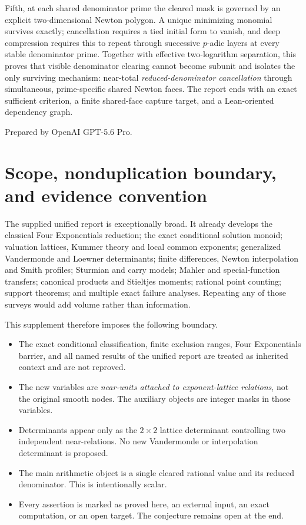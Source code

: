 \documentclass[11pt,oneside]{article}
\theoremstyle{definition}
\theoremstyle{remark}
\begin{document}
\begin{titlepage}
\begin{minipage}{0.91\textwidth}
Fifth, at each shared denominator prime the cleared mask is governed by an explicit
two-dimensional Newton polygon.  A unique minimizing monomial survives exactly; cancellation
requires a tied initial form to vanish, and deep compression requires this to repeat through
successive $p$-adic layers at every stable denominator prime.  Together with effective
two-logarithm separation, this proves that visible denominator clearing cannot become subunit
and isolates the only surviving mechanism: near-total \emph{reduced-denominator cancellation}
through simultaneous, prime-specific shared Newton faces.  The report ends with an exact
sufficient criterion, a finite shared-face capture target, and a Lean-oriented dependency
graph.
\end{minipage}
\vfill
{\small Prepared by OpenAI GPT-5.6 Pro.}
\end{titlepage}

\tableofcontents
\clearpage
{}

\section{Scope, nonduplication boundary, and evidence convention}
\label{sec:scope}

The supplied unified report is exceptionally broad.  It already develops the classical
Four Exponentials reduction; the exact conditional solution monoid; valuation lattices,
Kummer theory and local common exponents; generalized Vandermonde and Loewner determinants;
finite differences, Newton interpolation and Smith profiles; Sturmian and carry models;
Mahler and special-function transfers; canonical products and Stieltjes moments; rational
point counting; support theorems; and multiple exact failure analyses.  Repeating any of
those surveys would add volume rather than information.

This supplement therefore imposes the following boundary.

\begin{itemize}
\item The exact conditional classification, finite exclusion ranges, Four Exponentials
  barrier, and all named results of the unified report are treated as inherited context and
  are not reproved.
\item The new variables are \emph{near-units attached to exponent-lattice relations}, not
  the original smooth nodes.  The auxiliary objects are integer masks in those variables.
\item Determinants appear only as the $2\times2$ lattice determinant controlling two
  independent near-relations.  No new Vandermonde or interpolation determinant is proposed.
\item The main arithmetic object is a single cleared rational value and its reduced
  denominator.  This is intentionally scalar.
\item Every assertion is marked as proved here, an external input, an exact computation, or
  an open target.  The conjecture remains open at the end.
\end{itemize}
\end{document}
